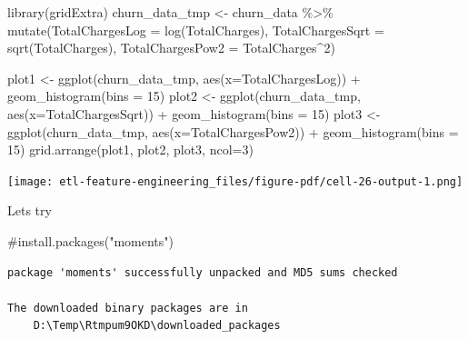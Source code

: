 \documentclass[
  letterpaper,
  DIV=11,
  numbers=noendperiod]{scrreprt}
\newenvironment{Shaded}{\begin{snugshade}}{\end{snugshade}}
\newcommand{\AttributeTok}[1]{\textcolor[rgb]{0.40,0.45,0.13}{#1}}
\newcommand{\CommentTok}[1]{\textcolor[rgb]{0.37,0.37,0.37}{#1}}
\newcommand{\DecValTok}[1]{\textcolor[rgb]{0.68,0.00,0.00}{#1}}
\newcommand{\FunctionTok}[1]{\textcolor[rgb]{0.28,0.35,0.67}{#1}}
\newcommand{\NormalTok}[1]{\textcolor[rgb]{0.00,0.23,0.31}{#1}}
\newcommand{\OtherTok}[1]{\textcolor[rgb]{0.00,0.23,0.31}{#1}}
\newcommand{\SpecialCharTok}[1]{\textcolor[rgb]{0.37,0.37,0.37}{#1}}
\begin{document}
\begin{Shaded}
\begin{Highlighting}[]
\FunctionTok{library}\NormalTok{(gridExtra)}
\NormalTok{churn\_data\_tmp }\OtherTok{\textless{}{-}}\NormalTok{ churn\_data }\SpecialCharTok{\%\textgreater{}\%}
        \FunctionTok{mutate}\NormalTok{(}\AttributeTok{TotalChargesLog =} \FunctionTok{log}\NormalTok{(TotalCharges),}
              \AttributeTok{TotalChargesSqrt =} \FunctionTok{sqrt}\NormalTok{(TotalCharges),}
              \AttributeTok{TotalChargesPow2 =}\NormalTok{ TotalCharges}\SpecialCharTok{\^{}}\DecValTok{2}\NormalTok{)}

\NormalTok{plot1 }\OtherTok{\textless{}{-}} \FunctionTok{ggplot}\NormalTok{(churn\_data\_tmp, }\FunctionTok{aes}\NormalTok{(}\AttributeTok{x=}\NormalTok{TotalChargesLog)) }\SpecialCharTok{+} \FunctionTok{geom\_histogram}\NormalTok{(}\AttributeTok{bins =} \DecValTok{15}\NormalTok{)}
\NormalTok{plot2 }\OtherTok{\textless{}{-}} \FunctionTok{ggplot}\NormalTok{(churn\_data\_tmp, }\FunctionTok{aes}\NormalTok{(}\AttributeTok{x=}\NormalTok{TotalChargesSqrt)) }\SpecialCharTok{+} \FunctionTok{geom\_histogram}\NormalTok{(}\AttributeTok{bins =} \DecValTok{15}\NormalTok{)}
\NormalTok{plot3 }\OtherTok{\textless{}{-}} \FunctionTok{ggplot}\NormalTok{(churn\_data\_tmp, }\FunctionTok{aes}\NormalTok{(}\AttributeTok{x=}\NormalTok{TotalChargesPow2)) }\SpecialCharTok{+} \FunctionTok{geom\_histogram}\NormalTok{(}\AttributeTok{bins =} \DecValTok{15}\NormalTok{)}
\FunctionTok{grid.arrange}\NormalTok{(plot1, plot2, plot3, }\AttributeTok{ncol=}\DecValTok{3}\NormalTok{) }
\end{Highlighting}
\end{Shaded}

\texttt{[image: etl-feature-engineering\_files/figure-pdf/cell-26-output-1.png]}

Lets try

\begin{Shaded}
\begin{Highlighting}[]
\CommentTok{\#install.packages("moments")}
\end{Highlighting}
\end{Shaded}

\begin{verbatim}
package 'moments' successfully unpacked and MD5 sums checked

The downloaded binary packages are in
    D:\Temp\Rtmpum9OKD\downloaded_packages
\end{verbatim}

\begin{Shaded}
\end{Shaded}
\end{document}

